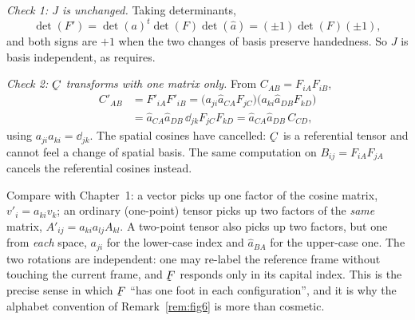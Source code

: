 \emph{Check 1: $J$ is unchanged.} Taking determinants,
\[
   \det(F')=\det(a)^{t}\det(F)\det(\hat a)=(\pm1)\det(F)(\pm1),
\]
and both signs are $+1$ when the two changes of basis preserve
handedness. So $J$ is basis independent, as  requires.

\emph{Check 2: $\bC$ transforms with one matrix only.} From
$C_{AB}=F_{iA}F_{iB}$,
\[
\begin{aligned}
   C'_{AB}&=F'_{iA}F'_{iB}
   =\big(a_{ji}\hat a_{CA}F_{jC}\big)\big(a_{ki}\hat a_{DB}F_{kD}\big)\\
   &=\hat a_{CA}\hat a_{DB}\,\dd_{jk}F_{jC}F_{kD}
   =\hat a_{CA}\hat a_{DB}\,C_{CD},
\end{aligned}
\]
using $a_{ji}a_{ki}=\dd_{jk}$. The spatial cosines have cancelled: $\bC$
is a referential tensor and cannot feel a change of spatial basis. The
same computation on $B_{ij}=F_{iA}F_{jA}$ cancels the referential cosines
instead.

\begin{remark}
\label{rem:2ptlaw}
Compare with Chapter~1: a vector picks up one factor of the cosine matrix,
$v'_i=a_{ki}v_k$; an ordinary (one-point) tensor picks up two factors of the
\emph{same} matrix, $A'_{ij}=a_{ki}a_{lj}A_{kl}$. A two-point tensor also
picks up two factors, but one from \emph{each} space, $a_{ji}$ for the
lower-case index and $\hat a_{BA}$ for the upper-case one. The two rotations
are independent: one may re-label the reference frame without touching the
current frame, and $\bF$ responds only in its capital index. This is the
precise sense in which $\bF$ ``has one foot in each configuration'', and it
is why the alphabet convention of Remark~\ref{rem:fig6} is more than
cosmetic.
\end{remark}

